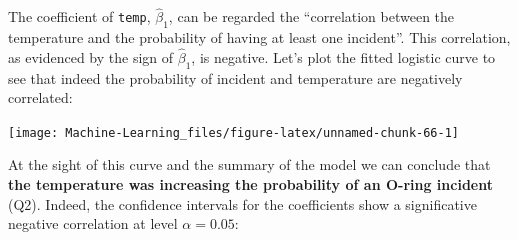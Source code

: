 \documentclass[]{book}
\newenvironment{Shaded}{\begin{snugshade}}{\end{snugshade}}
\newcommand{\KeywordTok}[1]{\textcolor[rgb]{0.13,0.29,0.53}{\textbf{#1}}}
\newcommand{\DataTypeTok}[1]{\textcolor[rgb]{0.13,0.29,0.53}{#1}}
\newcommand{\DecValTok}[1]{\textcolor[rgb]{0.00,0.00,0.81}{#1}}
\newcommand{\FloatTok}[1]{\textcolor[rgb]{0.00,0.00,0.81}{#1}}
\newcommand{\StringTok}[1]{\textcolor[rgb]{0.31,0.60,0.02}{#1}}
\newcommand{\CommentTok}[1]{\textcolor[rgb]{0.56,0.35,0.01}{\textit{#1}}}
\newcommand{\OperatorTok}[1]{\textcolor[rgb]{0.81,0.36,0.00}{\textbf{#1}}}
\newcommand{\NormalTok}[1]{#1}
\theoremstyle{definition}
\theoremstyle{definition}
\theoremstyle{definition}
\theoremstyle{remark}
\begin{document}
The coefficient of \texttt{temp}, \(\hat\beta_1\), can be regarded the
``correlation between the temperature and the probability of having at
least one incident''. This correlation, as evidenced by the sign of
\(\hat\beta_1\), is negative. Let's plot the fitted logistic curve to
see that indeed the probability of incident and temperature are
negatively correlated:

\begin{Shaded}
\end{Shaded}

\begin{center}\texttt{[image: Machine-Learning\_files/figure-latex/unnamed-chunk-66-1]} \end{center}

At the sight of this curve and the summary of the model we can conclude
that \textbf{the temperature was increasing the probability of an O-ring
incident} (Q2). Indeed, the confidence intervals for the coefficients
show a significative negative correlation at level \(\alpha=0.05\):
\end{document}
